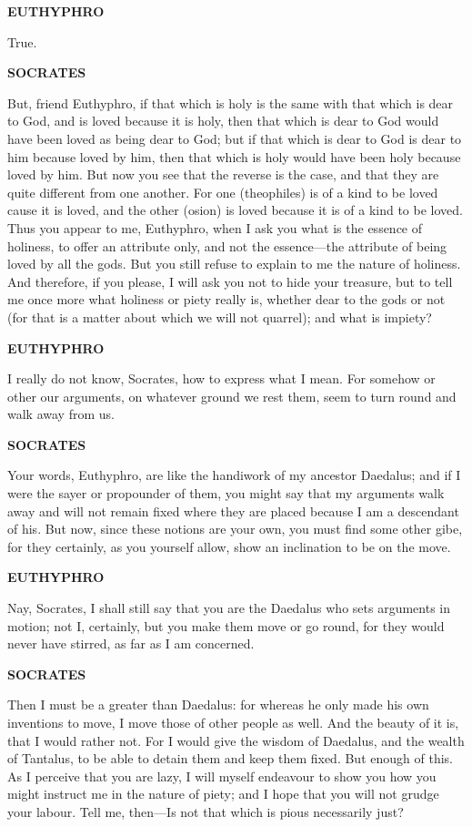 \documentclass[11pt,letter]{article}
\begin{document}
\par \textbf{EUTHYPHRO}
\par   True.

\par \textbf{SOCRATES}
\par   But, friend Euthyphro, if that which is holy is the same with that which is dear to God, and is loved because it is holy, then that which is dear to God would have been loved as being dear to God; but if that which is dear to God is dear to him because loved by him, then that which is holy would have been holy because loved by him. But now you see that the reverse is the case, and that they are quite different from one another. For one (theophiles) is of a kind to be loved cause it is loved, and the other (osion) is loved because it is of a kind to be loved. Thus you appear to me, Euthyphro, when I ask you what is the essence of holiness, to offer an attribute only, and not the essence—the attribute of being loved by all the gods. But you still refuse to explain to me the nature of holiness. And therefore, if you please, I will ask you not to hide your treasure, but to tell me once more what holiness or piety really is, whether dear to the gods or not (for that is a matter about which we will not quarrel); and what is impiety?

\par \textbf{EUTHYPHRO}
\par   I really do not know, Socrates, how to express what I mean. For somehow or other our arguments, on whatever ground we rest them, seem to turn round and walk away from us.

\par \textbf{SOCRATES}
\par   Your words, Euthyphro, are like the handiwork of my ancestor Daedalus; and if I were the sayer or propounder of them, you might say that my arguments walk away and will not remain fixed where they are placed because I am a descendant of his. But now, since these notions are your own, you must find some other gibe, for they certainly, as you yourself allow, show an inclination to be on the move.

\par \textbf{EUTHYPHRO}
\par   Nay, Socrates, I shall still say that you are the Daedalus who sets arguments in motion; not I, certainly, but you make them move or go round, for they would never have stirred, as far as I am concerned.

\par \textbf{SOCRATES}
\par   Then I must be a greater than Daedalus:  for whereas he only made his own inventions to move, I move those of other people as well. And the beauty of it is, that I would rather not. For I would give the wisdom of Daedalus, and the wealth of Tantalus, to be able to detain them and keep them fixed. But enough of this. As I perceive that you are lazy, I will myself endeavour to show you how you might instruct me in the nature of piety; and I hope that you will not grudge your labour. Tell me, then—Is not that which is pious necessarily just?
\end{document}
